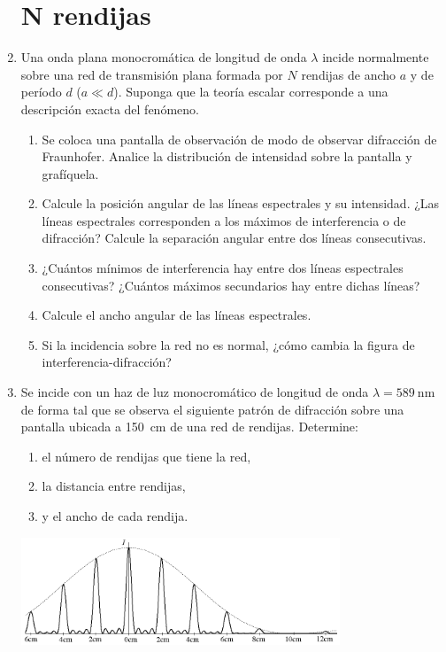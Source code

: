 \documentclass[11pt,spanish,a4paper]{article}
\begin{document}
\begin{enumerate}
\section*{N rendijas}


\item 
Una onda plana monocromática de longitud de onda \(\lambda\) incide normalmente sobre una red de transmisión plana formada por \(N\) rendijas de ancho \(a\) y de período \(d\) (\(a \ll d\)).
Suponga que la teoría escalar corresponde a una descripción exacta del fenómeno.
\begin{enumerate}
\item Se coloca una pantalla de observación de modo de observar difracción de Fraunhofer.
	Analice la distribución de intensidad sobre la pantalla y grafíquela.
\item Calcule la posición angular de las líneas espectrales y su intensidad.
	¿Las líneas espectrales corresponden a los máximos de interferencia o de difracción?
	Calcule la separación angular entre dos líneas consecutivas.
\item ¿Cuántos mínimos de interferencia hay entre dos líneas espectrales consecutivas?
	¿Cuántos máximos secundarios hay entre dichas líneas?
\item Calcule el ancho angular de las líneas espectrales.
\item Si la incidencia sobre la red no es normal, ¿cómo cambia la figura de interferencia-difracción?
\end{enumerate}



\item 
Se incide con un haz de luz monocromático de longitud de onda \(\lambda= \SI{589}{\nano\metre}\) de forma tal que se observa el siguiente patrón de difracción sobre una pantalla ubicada a \SI{150}{\centi\metre} de una red de rendijas.
Determine:
\begin{enumerate}
	\item el número de rendijas que tiene la red,
	\item la distancia entre rendijas,
	\item y el ancho de cada rendija.
\end{enumerate}
\begin{center}
	\includegraphics[width=0.75\textwidth]{g09e11}
\end{center}



\end{enumerate}
\end{document}

